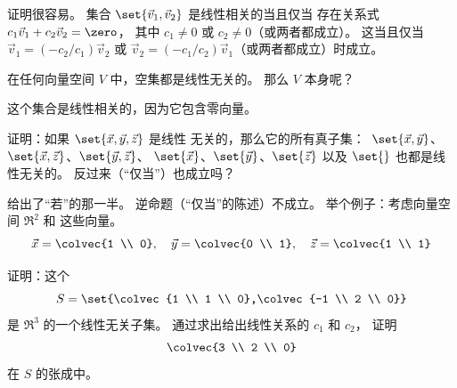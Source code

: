 \begin{exercises}
\begin{answer}
\begin{exparts}
          证明很容易。
          集合 $\set{\vec{v}_1,\vec{v}_2}$ 是线性相关的当且仅当
          存在关系式 $c_1\vec{v}_1+c_2\vec{v}_2=\zero$，
          其中 $c_1\neq 0$ 或 $c_2\neq 0$（或两者都成立）。
          这当且仅当 $\vec{v}_1=(-c_2/c_1)\vec{v}_2$
          或 $\vec{v}_2=(-c_1/c_2)\vec{v}_1$（或两者都成立）时成立。
       \end{exparts}
     \end{answer}
  \item
    在任何向量空间 \( V \) 中，空集都是线性无关的。
    那么 \( V \) 本身呢？
    \begin{answer}
      这个集合是线性相关的，因为它包含零向量。
    \end{answer}
  \item
    证明：如果 \( \set{\vec{x},\vec{y},\vec{z}} \) 是线性
    无关的，那么它的所有真子集：~\( \set{\vec{x},\vec{y}} \)、
    \( \set{\vec{x},\vec{z}} \)、\( \set{\vec{y},\vec{z}} \)、
    \( \set{\vec{x}} \)、\( \set{\vec{y}} \)、\( \set{\vec{z}} \)
    以及 \( \set{} \) 也都是线性无关的。
    反过来（“仅当”）也成立吗？
    \begin{answer}
       给出了“若”的那一半。
      逆命题（“仅当”的陈述）不成立。
      举个例子：考虑向量空间 \( \Re^2 \) 和
      这些向量。
      \begin{equation*}
         \vec{x}=\colvec{1 \\ 0},\quad
         \vec{y}=\colvec{0 \\ 1},\quad
         \vec{z}=\colvec{1 \\ 1}
      \end{equation*}
    \end{answer}
  \item
    \begin{exparts}
      \partsitem 证明：这个
        \begin{equation*}
          S=\set{\colvec{1 \\ 1 \\ 0},\colvec{-1 \\ 2 \\ 0}}
        \end{equation*}
        是 \( \Re^3 \) 的一个线性无关子集。
      \partsitem 通过求出给出线性关系的 \( c_1 \) 和 \( c_2 \)，
        证明
        \begin{equation*}
          \colvec{3 \\ 2 \\ 0}
        \end{equation*}
        在 $S$ 的张成中。

\end{exparts}
\end{exercises}
